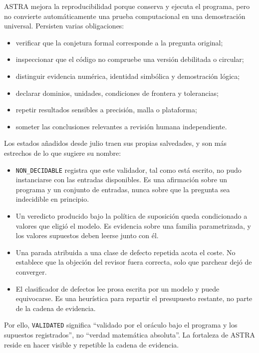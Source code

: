 \documentclass[11pt,a4paper]{article}
\begin{document}
ASTRA mejora la reproducibilidad porque conserva y ejecuta el programa, pero no convierte automáticamente una prueba computacional en una demostración universal. Persisten varias obligaciones:

\begin{itemize}
  \item verificar que la conjetura formal corresponde a la pregunta original;
  \item inspeccionar que el código no compruebe una versión debilitada o circular;
  \item distinguir evidencia numérica, identidad simbólica y demostración lógica;
  \item declarar dominios, unidades, condiciones de frontera y tolerancias;
  \item repetir resultados sensibles a precisión, malla o plataforma;
  \item someter las conclusiones relevantes a revisión humana independiente.
\end{itemize}

Los estados añadidos desde julio traen sus propias salvedades, y son más estrechos de lo que sugiere su nombre:

\begin{itemize}
  \item \texttt{NON\_DECIDABLE} registra que este validador, tal como está escrito, no pudo instanciarse con las entradas disponibles. Es una afirmación sobre un programa y un conjunto de entradas, nunca sobre que la pregunta sea indecidible en principio.
  \item Un veredicto producido bajo la política de suposición queda condicionado a valores que eligió el modelo. Es evidencia sobre una familia parametrizada, y los valores supuestos deben leerse junto con él.
  \item Una parada atribuida a una clase de defecto repetida acota el coste. No establece que la objeción del revisor fuera correcta, solo que parchear dejó de converger.
  \item El clasificador de defectos lee prosa escrita por un modelo y puede equivocarse. Es una heurística para repartir el presupuesto restante, no parte de la cadena de evidencia.
\end{itemize}

Por ello, \texttt{VALIDATED} significa ``validado por el oráculo bajo el programa y los supuestos registrados'', no ``verdad matemática absoluta''. La fortaleza de ASTRA reside en hacer visible y repetible la cadena de evidencia.
\end{document}
